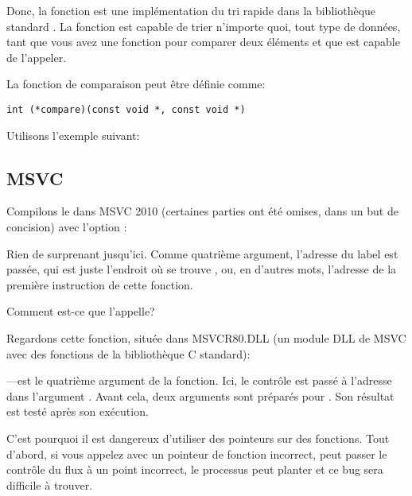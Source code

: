 
Donc, la fonction \qsort est une implémentation du tri rapide dans la bibliothèque
standard \CCpp.
La fonction est capable de trier n'importe quoi, tout type de données, tant que vous
avez une fonction pour comparer deux éléments et que \qsort est capable de l'appeler.

La fonction de comparaison peut être définie comme:

\begin{lstlisting}
int (*compare)(const void *, const void *)
\end{lstlisting}

Utilisons l'exemple suivant:



\subsection{MSVC}

Compilons le dans MSVC 2010 (certaines parties ont été omises, dans un but de concision)
avec l'option \TT{\Ox}:



Rien de surprenant jusqu'ici.
Comme quatrième argument, l'adresse du label  est passée, qui est juste
l'endroit où se trouve \comp, ou, en d'autres mots, l'adresse de la première instruction
de cette fonction.

Comment est-ce que \qsort l'appelle?


Regardons cette fonction, située dans MSVCR80.DLL (un module DLL de MSVC avec des
fonctions de la bibliothèque C standard):



---est le quatrième argument de la fonction.
Ici, le contrôle est passé à l'adresse dans l'argument .
Avant cela, deux arguments sont préparés pour \comp. Son résultat est testé après
son exécution.

C'est pourquoi il est dangereux d'utiliser des pointeurs sur des fonctions.
Tout d'abord, si vous appelez \qsort avec un pointeur de fonction incorrect, \qsort
peut passer le contrôle du flux à un point incorrect, le processus peut planter et
ce bug sera difficile à trouver.

